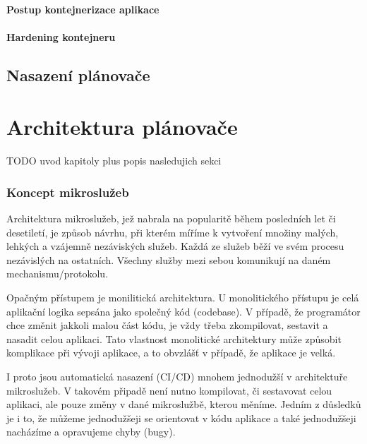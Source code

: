 \documentclass[thesis=M,czech]{FITthesis}[2019/12/23]
\theoremstyle{plain}
\theoremstyle{definition}
\begin{document}
\subsubsection{Postup kontejnerizace aplikace}


\subsubsection{Hardening kontejneru}


\section{Nasazení plánovače}


\chapter{Architektura plánovače}

TODO uvod kapitoly plus popis nasledujich sekci




\subsection{Koncept mikroslužeb}

Architektura mikroslužeb, jež nabrala na popularitě během posledních let či desetiletí, je způsob návrhu, při kterém míříme k vytvoření množiny malých, lehkých a vzájemně nezáviských služeb. Každá ze služeb běží ve svém procesu nezávislých na ostatních. Všechny služby mezi sebou komunikují na daném mechanismu/protokolu.

Opačným přístupem je monilitická architektura. U monolitického přístupu je celá aplikační logika sepsána jako společný kód (codebase). V případě, že programátor chce změnit jakkoli malou část kódu, je vždy třeba zkompilovat, sestavit a nasadit celou aplikaci. Tato vlastnost monolitické architektury může způsobit komplikace při vývoji aplikace, a to obvzlášť v případě, že aplikace je velká.

I proto jsou automatická nasazení (CI/CD) mnohem jednodužší v architektuře mikroslužeb. V takovém připadě není nutno kompilovat, či sestavovat celou aplikaci, ale pouze změny v dané mikroslužbě, kterou měníme. Jedním z důsledků je i to, že můžeme jednodužšeji se orientovat v kódu aplikace a také jednodužšeji nacházíme a opravujeme chyby (bugy).
\end{document}
